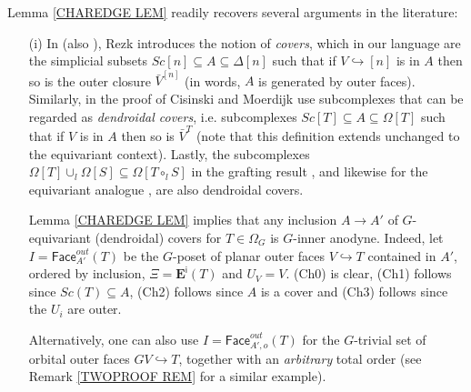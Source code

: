 \documentclass[a4paper,10pt
 ,draft
]{article}%
\begin{document}


\begin{remark} \label{RECOVER REM}
Lemma \ref{CHAREDGE LEM} readily recovers several arguments in the literature:
\begin{itemize}
\item[(i)] In \cite[\S 10]{Rez01} (also \cite[\S 6.2]{Rez10}), Rezk introduces the notion of \textit{covers}, which in our language are the simplicial subsets
$Sc[n] \subseteq A \subseteq \Delta[n]$
such that if $V \hookrightarrow [n]$ is in $A$ then so is the outer closure $\bar{V}^{[n]}$
(in words, $A$ is generated by outer faces).
Similarly, in the proof of \cite[Prop. 2.4]{CM13a}
Cisinski and Moerdijk use subcomplexes
that can be regarded as
\textit{dendroidal covers},
i.e. subcomplexes
$Sc[T] \subseteq A \subseteq \Omega[T]$
such that if $V$ is in $A$ then so is $\bar{V}^{T}$
(note that this definition extends unchanged to the equivariant context).
Lastly, the subcomplexes 
$\Omega[T] \cup_l \Omega[S] \subseteq \Omega[T \circ_l S]$
in the grafting result \cite[Lemma 5.2]{MW09},
and likewise for the equivariant analogue \cite[Prop. 6.19]{Per18}, are also dendroidal covers.

Lemma \ref{CHAREDGE LEM} implies
that any inclusion $A \to A'$ of $G$-equivariant (dendroidal) covers for $T\in \Omega_G$
is $G$-inner anodyne. 
Indeed, let $I=\mathsf{Face}_{A'}^{out}(T)$ be the $G$-poset of planar outer faces $V \hookrightarrow T$ contained in $A'$, ordered by inclusion, 
$\Xi = \boldsymbol{E}^{\mathsf{i}}(T)$ and $U_V = V$.
(Ch0) is clear, (Ch1) follows since 
$Sc(T) \subseteq A$, (Ch2) follows since $A$ is a cover and
(Ch3) follows since the $U_i$ are outer.

Alternatively, one can also use $I=\mathsf{Face}_{A',o}^{out}(T)$
for the $G$-trivial set of orbital outer faces 
$GV \hookrightarrow T$,
together with an \textit{arbitrary} total order (see Remark \ref{TWOPROOF REM} for a similar example).


\end{itemize}
\end{remark}
\end{document}
